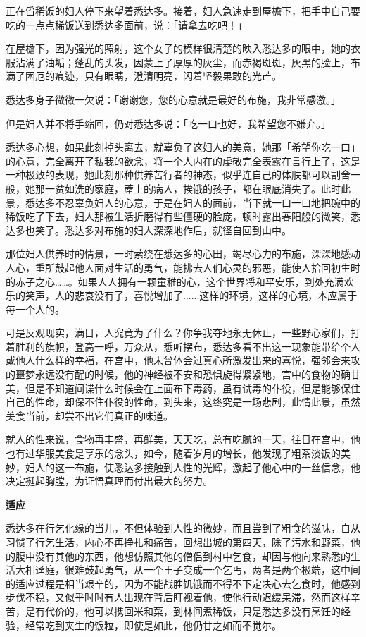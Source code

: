\documentclass[12pt,twoside,openany]{book}
\newcommand{\mt}[1]{\textbullet \textbf{#1}}
\begin{document}
正在舀稀饭的妇人停下来望着悉达多。接着，妇人急速走到屋檐下，把手中自己要吃的一点点稀饭送到悉达多面前，说：「请拿去吃吧！」

在屋檐下，因为强光的照射，这个女子的模样很清楚的映入悉达多的眼中，她的衣服沾满了油垢；蓬乱的头发，因蒙上了厚厚的灰尘，而赤褐斑斑，灰黑的脸上，布满了困厄的痕迹，只有眼睛，澄清明亮，闪着坚毅果敢的光芒。

悉达多身子微微一欠说：「谢谢您，您的心意就是最好的布施，我非常感激。」

但是妇人并不将手缩回，仍对悉达多说：「吃一口也好，我希望您不嫌弃。」

悉达多心想，如果此刻掉头离去，就辜负了这妇人的美意，她那「希望你吃一口」的心意，完全离开了私我的欲念，将一个人内在的虔敬完全表露在言行上了，这是一种极致的表现，她此刻那种供养苦行者的神态，似乎连自己的体肤都可以割舍一般，她那一贫如洗的家庭，蓆上的病人，挨饿的孩子，都在眼底消失了。此时此景，悉达多不忍辜负妇人的心意，于是在妇人的面前，当下就一口一口地把碗中的稀饭吃了下去，妇人那被生活折磨得有些僵硬的脸庞，顿时露出春阳般的微笑，悉达多也笑了。悉达多对布施的妇人深深地作后，就径自回到山中。

那位妇人供养时的情景，一时萦绕在悉达多的心田，竭尽心力的布施，深深地感动人心，重所鼓起他人面对生活的勇气，能拂去人们心灵的邪恶，能使人拾回初生时的赤子之心……。如果人人拥有一颗童稚的心，这个世界将和平安乐，到处充满欢乐的笑声，人的悲哀没有了，喜悦增加了......这样的环境，这样的心境，本应属于每一个人的。

可是反观现实，满目，人究竟为了什么？你争我夺地永无休止，一些野心家们，打着胜利的旗帜，登高一呼，万众从，悉听摆布，悉达多看不出这一现象能带给个人或他人什么样的幸福，在宫中，他未曾体会过真心所激发出来的喜悦，强邻会来攻的噩梦永远没有醒的时候，他的神经被不安和恐惧旋得紧紧地，宫中的食物的确甘美，但是不知道间谍什么时候会在上面布下毒药，虽有试毒的仆役，但是能够保住自己的性命，却保不住仆役的性命，到头来，这终究是一场悲剧，此情此景，虽然美食当前，却尝不出它们真正的味道。

就人的性来说，食物再丰盛，再鲜美，天天吃，总有吃腻的一天，往日在宫中，他也有过华服美食是享乐的念头，如今，随着岁月的增长，他发现了粗茶淡饭的美妙，妇人的这一布施，使悉达多接触到人性的光辉，激起了他心中的一丝信念，他决定挺起胸膛，为证悟真理而付出最大的努力。

\mt{适应}

悉达多在行乞化缘的当儿，不但体验到人性的微妙，而且尝到了粗食的滋味，自从习惯了行乞生活，内心不再挣扎和痛苦，回想出城的第四天，除了污水和野菜，他的腹中没有其他的东西，他想仿照其他的僧侣到村中乞食，却因与他向来熟悉的生活大相迳庭，很难鼓起勇气，从一个王子变成一个乞丐，两者是两个极端，这中间的适应过程是相当艰辛的，因为不能战胜饥饿而不得不下定决心去乞食时，他感到步伐不稳，又似乎时时有人出现在背后盯视着他，使他行动迟缓呆滞，然而这样辛苦，是有代价的，他可以携回米和菜，到林间煮稀饭，只是悉达多没有烹饪的经验，经常吃到夹生的饭粒，即使是如此，他仍甘之如而不觉尔。
\end{document}
